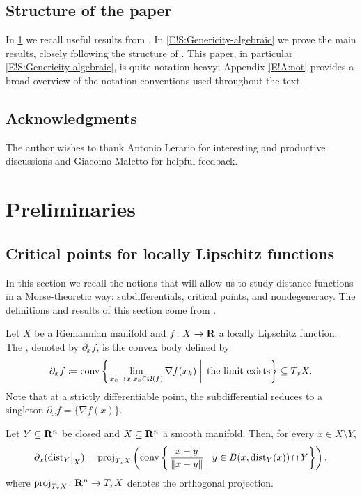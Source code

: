 \subsection{Structure of the paper}

In \cref{E!S:prelim} we recall useful results from \cite{GLRS2025}. In \cref{E!S:Genericity-algebraic} we prove the main results, closely following the structure of \cite[Section 4]{GLRS2025}. This paper, in particular \cref{E!S:Genericity-algebraic}, is quite notation-heavy; Appendix \ref{E!A:not} provides a broad overview of the notation conventions used throughout the text.

\subsection{Acknowledgments}
The author wishes to thank Antonio Lerario for interesting and productive discussions and Giacomo Maletto for helpful feedback.

\section{Preliminaries}
\label{E!S:prelim}

\subsection{Critical points for locally Lipschitz functions}

In this section we recall the notions that will allow us to study distance functions in a Morse-theoretic way: subdifferentials, critical points, and nondegeneracy. The definitions and results of this section come from \cite{GLRS2025}.

\begin{definition}[Subdifferential]
\label{E!def:subdifferential}
  Let $X$ be a Riemannian manifold and $f \colon X \to \mathbf{R}$ a locally Lipschitz function. The , denoted by $\partial_x f$, is the convex body defined by
  \[
    \partial_x f \coloneq \operatorname{conv} \left\{ \left. \lim_{x_k \to x, x_k \in \Omega(f)} \nabla f(x_k) \; \right| \; \textnormal{the limit exists} \right\} \subseteq T_x X.
  \]
  Note that at a strictly differentiable point, the subdifferential reduces to a singleton $\partial_x f = \{\nabla f(x)\}$.
\end{definition}

\begin{proposition}
\label{E!P:subdiff}
  Let $Y \subseteq \mathbf{R}^n$ be closed and $X \subseteq \mathbf{R}^n$ a smooth manifold. Then, for every $x \in X \setminus Y$,
  \[
    \partial_x(\mathord{\operatorname{dist}}_Y\big|_X) = \operatorname{proj}_{T_x X} \left( \operatorname{conv} \left\{ \left.
      \frac{x - y}{\|x - y\|} \, \right| \, y \in B(x, \operatorname{dist}_Y(x)) \cap Y
    \right\} \right),
  \]
  where $\operatorname{proj}_{T_x X} \colon \mathbf{R}^n \to T_xX$ denotes the orthogonal projection.
\end{proposition}


